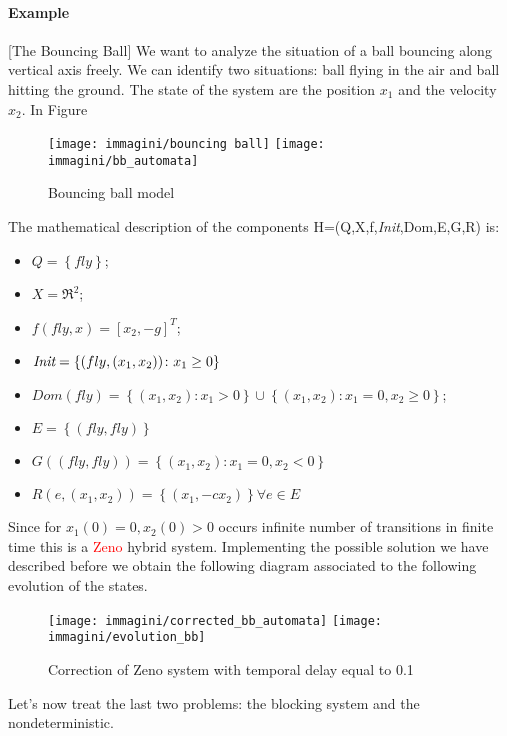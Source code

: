 \paragraph{Example}[The Bouncing Ball]
We want to analyze the situation of a ball bouncing along vertical axis freely. We can identify two situations: ball flying in the air and ball hitting the ground. The state of the system are the position $x_1$ and the velocity $x_2$. In Figure
\begin{figure}[h]
	\centering
	\texttt{[image: immagini/bouncing ball]}
	\texttt{[image: immagini/bb\_automata]}
	\caption{Bouncing ball model}
	\label{fig:bbautomata}
\end{figure}
The mathematical description of the components H=(Q,X,f,\textit{Init},Dom,E,G,R) is:
\begin{itemize}
	\item $Q=\left\{fly\right\}$;
	\item $X=\Re^2$;
	\item $f(fly,x)=[x_2,-g]^T$; 
	\item $\emph{Init}=\left\{(fly,(x_1,x_2))\colon x_1\ge0\right\}$ 
	\item $Dom(fly)=\left\{(x_1,x_2)\colon x_1>0\right\} \cup \left\{(x_1,x_2)\colon x_1= 0, x_2\ge 0 \right\}$;
	\item $E=\left\{(fly,fly)\right\}$
	\item$G((fly,fly))=\left\{(x_1,x_2)\colon x_1= 0, x_2<0 \right\}$
	\item$R(e,(x_1,x_2))=\left\{(x_1,-cx_2) \right\} \forall e \in E$
\end{itemize}
Since for $x_1(0)=0, x_2(0)>0$ occurs infinite number of transitions in finite time this is a \textcolor{red}{Zeno} hybrid system.
Implementing the possible solution we have described before we obtain the following diagram associated to the following evolution of the states.
\begin{figure}[h]
	\centering
	\texttt{[image: immagini/corrected\_bb\_automata]}
	\texttt{[image: immagini/evolution\_bb]}
	\caption{Correction of Zeno system with temporal delay equal to 0.1}
	\label{fig:bbautomata_corrected}
\end{figure}
Let's now treat the last two problems: the blocking system and the nondeterministic.
